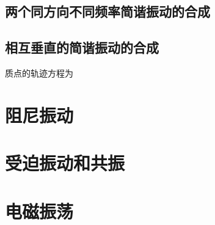     \subsection{两个同方向不同频率简谐振动的合成}
    \subsection{相互垂直的简谐振动的合成}
    质点的轨迹方程为

\section{阻尼振动}

\section{受迫振动和共振}

\section{电磁振荡}

\endinput